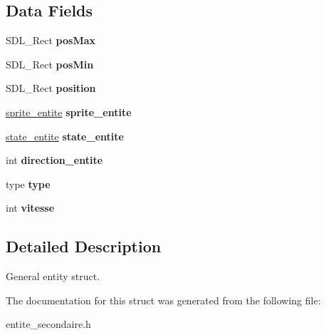 \subsection*{Data Fields}
\begin{DoxyCompactItemize}
\item 
\mbox{\label{structEntite_a9a50f732529d9d4fadb3f2a84f7c100e}} 
S\+D\+L\+\_\+\+Rect {\bfseries pos\+Max}
\item 
\mbox{\label{structEntite_a423bb0869194e380e2eeed768abc25e7}} 
S\+D\+L\+\_\+\+Rect {\bfseries pos\+Min}
\item 
\mbox{\label{structEntite_ab7d2d161df4c728b71096310110fc42f}} 
S\+D\+L\+\_\+\+Rect {\bfseries position}
\item 
\mbox{\label{structEntite_a02737936435247b355900e31b6f25a6a}} 
\hyperlink{structSprite__entite}{sprite\+\_\+entite} {\bfseries sprite\+\_\+entite}
\item 
\mbox{\label{structEntite_a1427b445875a07252153acfae59d5e29}} 
\hyperlink{structstate__entite}{state\+\_\+entite} {\bfseries state\+\_\+entite}
\item 
\mbox{\label{structEntite_aaf0a2ea54f84354fa8d31df7b20456d8}} 
int {\bfseries direction\+\_\+entite}
\item 
\mbox{\label{structEntite_a7a72d6d6556d3e526e3a2a5c197b17cd}} 
type {\bfseries type}
\item 
\mbox{\label{structEntite_a7b94da47ebaa582ad59e0b692a04b8fa}} 
int {\bfseries vitesse}
\end{DoxyCompactItemize}


\subsection{Detailed Description}
General entity struct. 

The documentation for this struct was generated from the following file\+:\begin{DoxyCompactItemize}
\item 
entite\+\_\+secondaire.\+h\end{DoxyCompactItemize}
